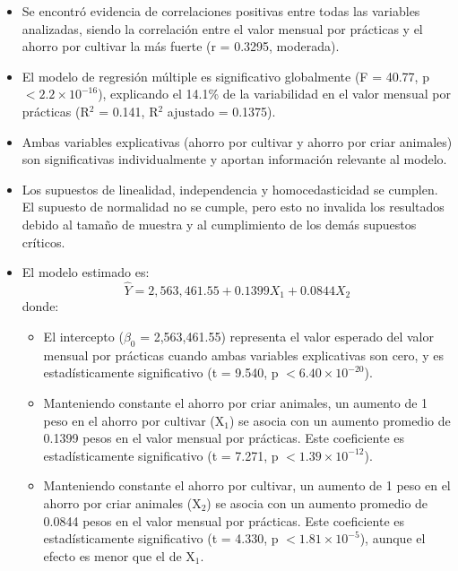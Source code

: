 \documentclass[12pt,a4paper]{article}
\begin{document}
\begin{itemize}
    \item Se encontró evidencia de correlaciones positivas entre todas las variables analizadas, siendo la correlación entre el valor mensual por prácticas y el ahorro por cultivar la más fuerte (r = 0.3295, moderada).
    \item El modelo de regresión múltiple es significativo globalmente (F = 40.77, p $< 2.2 \times 10^{-16}$), explicando el 14.1\% de la variabilidad en el valor mensual por prácticas (R$^2$ = 0.141, R$^2$ ajustado = 0.1375).
    \item Ambas variables explicativas (ahorro por cultivar y ahorro por criar animales) son significativas individualmente y aportan información relevante al modelo.
    \item Los supuestos de linealidad, independencia y homocedasticidad se cumplen. El supuesto de normalidad no se cumple, pero esto no invalida los resultados debido al tamaño de muestra y al cumplimiento de los demás supuestos críticos.
    \item El modelo estimado es:
    $$\hat{Y} = 2,563,461.55 + 0.1399 X_1 + 0.0844 X_2$$
    donde:
    \begin{itemize}
        \item El intercepto ($\beta_0$ = 2,563,461.55) representa el valor esperado del valor mensual por prácticas cuando ambas variables explicativas son cero, y es estadísticamente significativo (t = 9.540, p $< 6.40 \times 10^{-20}$).
        \item Manteniendo constante el ahorro por criar animales, un aumento de 1 peso en el ahorro por cultivar (X$_1$) se asocia con un aumento promedio de 0.1399 pesos en el valor mensual por prácticas. Este coeficiente es estadísticamente significativo (t = 7.271, p $< 1.39 \times 10^{-12}$).
        \item Manteniendo constante el ahorro por cultivar, un aumento de 1 peso en el ahorro por criar animales (X$_2$) se asocia con un aumento promedio de 0.0844 pesos en el valor mensual por prácticas. Este coeficiente es estadísticamente significativo (t = 4.330, p $< 1.81 \times 10^{-5}$), aunque el efecto es menor que el de X$_1$.
    \end{itemize}
\end{itemize}
\end{document}
